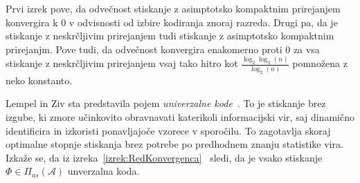 \documentclass[fin1, tisk]{fmfdelo}
\newcommand{\A}{\mathcal{A}}
\theoremstyle{definition}
\begin{document}
Prvi izrek pove, da odvečnost stiskanje z asimptotsko kompaktnim prirejanjem konvergira k $0$ v 
odvisnosti od izbire kodiranja znoraj razreda.
Drugi pa, da je stiskanje z neskrčljivim prirejanjem tudi stiskanje z asimptotsko kompaktnim 
prirejanjm. Pove tudi, da odvečnost konvergira enakomerno proti $0$ za vsa stiskanje z neskrčljivim 
prirejanjem vsaj tako hitro kot $\frac{\log_2 \log_2(n)}{\log_2(n)}$ pomnožena z neko konstanto.

Lempel in Ziv sta predstavila pojem \emph{univerzalne kode}~\cite{LempelZiv1977, Ziv1978, LempelZiv1978}.
To je stiskanje brez izgube, ki zmore učinkovito obravnavati katerikoli informacijski vir, saj
dinamično identificira in izkoristi ponavljajoče vzorece v sporočilu. To zagotavlja skoraj optimalne
stopnje stiskanja brez potrebe po predhodnem znanju statistike vira. Izkaže se, da iz 
izreka~\ref{izrek:RedKonvergenca}~\cite{KiefferYang2000} sledi, da je vsako stiskanje
$\varPhi \in \varPi_{as}(\A)$ unverzalna koda.
\end{document}
